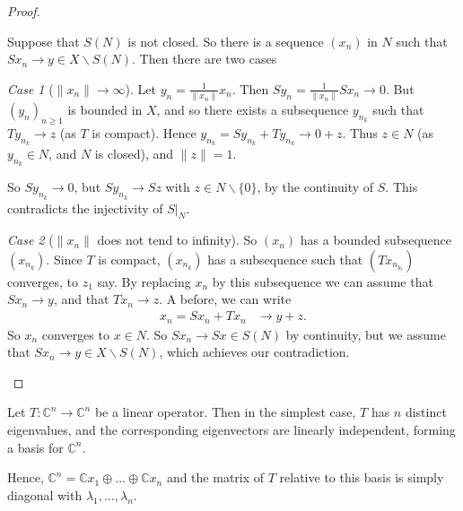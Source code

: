 \documentclass[10pt, oneside, reqno]{amsbook}
\theoremstyle{plain}%
\theoremstyle{definition}
\theoremstyle{remark}
\newtheorem{case}{Case}
\newcommand{\Com}{\mathbb{C}}
\begin{document}
\begin{proof}
\begin{enumerate}[(a)]
        Suppose that $S(N)$ is not closed.  So there is a sequence $(x_n)$ in $N$ such that $Sx_n \rightarrow y \in X \backslash S(N)$. Then there are two cases
        \begin{case}[$\| x_n \| \rightarrow \infty$]  Let $y_n = \frac{1}{\| x_n \|} x_n$.  Then $Sy_n = \frac{1}{\| x_n \|} S x_n \rightarrow 0$.  But $(y_n)_{ n \geq 1}$ is bounded in $X$, and so there exists a subsequence $y_{n_k}$ such that $T y_{n_k} \rightarrow z$ (as $T$ is compact).  Hence $y_{n_k} = S y_{n_k} + T y_{n_k} \rightarrow 0 + z$.  Thus $z \in N$ (as $y_{n_k} \in N$, and $N$ is closed), and $\| z \| = 1$.  
            
            So $S y_{n_k} \rightarrow 0$, but $S y_{n_k} \rightarrow Sz$ with $z \in N \backslash \{ 0 \}$, by the continuity of $S$.  This contradicts the injectivity of $S|_N$.  
        \end{case}   
        \begin{case}[$ \| x_n \|$ does not tend to infinity]
            So $(x_n)$ has a bounded subsequence $(x_{n_k})$.  Since $T$ is compact, $(x_{n_k})$ has a subsequence such that $(T x_{n_{k_l}})$ converges, to $z_1$ say.  By replacing $x_n$ by this subsequence we can assume that $Sx_n \rightarrow y$, and that $Tx_n \rightarrow z$.  A before, we can write \begin{align*}
            x_n = S x_n + T x_n &\rightarrow y + z.
            \end{align*}  So $x_n$ converges to $x \in N$.  So $S x_n \rightarrow Sx \in S(N)$ by continuity, but we assume that $S x_n \rightarrow y \in X \backslash S(N)$, which achieves our contradiction.
        \end{case}
    \end{enumerate}  
\end{proof}

Let $T: \Com^n \rightarrow \Com^n$ be a linear operator.  Then in the simplest case, $T$ has $n$ distinct eigenvalues, and the corresponding eigenvectors are linearly independent, forming a basis for $\Com^n$.  

Hence, $\Com^n = \Com x_1 \oplus \dots \oplus \Com x_n$ and the matrix of $T$ relative to this basis is simply diagonal with $\lambda_1, \dots, \lambda_n$.  
\end{document}
